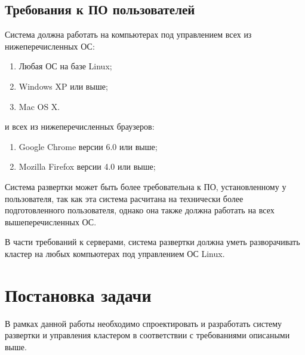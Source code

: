 \subsection{Требования к ПО пользователей}
Система должна работать на компьютерах под управлением всех из нижеперечисленных ОС:
\begin{enumerate}
  \item Любая ОС на базе Linux;
  \item Windows XP или выше;
  \item Mac OS X.
\end{enumerate}

и всех из нижеперечисленных браузеров:
\begin{enumerate}
  \item Google Chrome версии 6.0 или выше;
  \item Mozilla Firefox версии 4.0 или выше;
\end{enumerate}

Система развертки может быть более требовательна к ПО, установленному у пользователя, так как эта система расчитана на технически более подготовленного пользователя, однако она также должна работать на всех вышеперечисленных ОС.

В части требований к серверами, система развертки должна уметь разворачивать кластер на любых компьютерах под управлением ОС Linux.


\section{Постановка задачи}

В рамках данной работы необходимо спроектировать и разработать систему развертки и управления кластером в соответствии с требованиями описаными выше.






